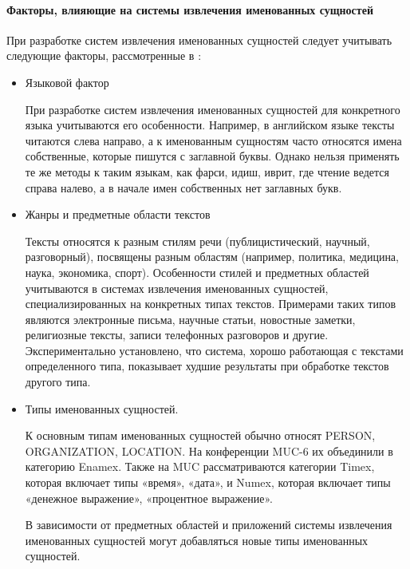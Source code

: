 \documentclass[14pt,russian]{extreport}
\begin{document}
\paragraph{Факторы, влияющие на системы извлечения именованных сущностей}

При разработке систем извлечения именованных сущностей следует учитывать
следующие факторы, рассмотренные в \cite{nadeau2007survey}:

\begin{itemize}
  \item Языковой фактор

    При разработке систем извлечения именованных сущностей для конкретного
    языка учитываются его особенности. Например, в английском языке тексты
    читаются слева направо, а к именованным сущностям часто относятся имена
    собственные, которые пишутся с заглавной буквы. Однако нельзя применять те
    же методы к таким языкам, как фарси, идиш, иврит, где чтение ведется справа
    налево, а в начале имен собственных нет заглавных букв.

  \item Жанры и предметные области текстов

    Тексты относятся к разным стилям речи (публицистический, научный,
    разговорный), посвящены разным областям (например, политика, медицина,
    наука, экономика, спорт). Особенности стилей и предметных областей
    учитываются в системах извлечения именованных сущностей, специализированных
    на конкретных типах текстов. Примерами таких типов являются электронные
    письма, научные статьи, новостные заметки, религиозные тексты, записи
    телефонных разговоров и другие. Экспериментально установлено, что система,
    хорошо работающая с текстами определенного типа, показывает худшие
    результаты при обработке текстов другого типа.

  \item Типы именованных сущностей.

    К основным типам именованных сущностей обычно относят PERSON, ORGANIZATION,
    LOCATION. На конференции MUC-6 их объединили в категорию Enamex. Также на
    MUC рассматриваются категории Timex, которая включает типы «время», «дата»,
    и Numex, которая включает типы «денежное выражение», «процентное
    выражение».

    В зависимости от предметных областей и приложений системы извлечения
    именованных сущностей могут добавляться новые типы именованных сущностей.
\end{itemize}
\end{document}

